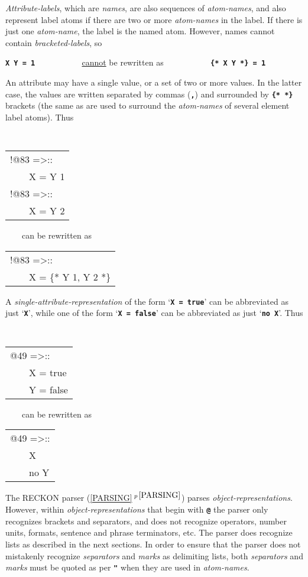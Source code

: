 \documentclass[12pt]{article}
\newcommand{\TT}[1]{{\tt \bfseries #1}}
\newcommand{\secref}[1]{\ref{#1}$\,^{p\,\pageref{#1}}$}
\begin{document}
{\em Attribute-labels}, which are {\em names}, are also sequences
of {\em atom-names}, and also represent label atoms if there are two
or more {\em atom-names} in the label.  If there is just one {\em atom-name},
the label is the named atom.  However, names
cannot contain {\em bracketed-labels},
so
\begin{center}
\TT{X Y = 1} ~~~~~~~~~~ \underline{cannot} be rewritten as ~~~~~~~~~~
         \TT{\{* X Y *\} = 1}
\end{center}

An attribute may have a single value, or a set of two or more
values.  In the latter case, the values are written separated by
commas (\TT{,}) and surrounded by \TT{\{*~*\}} brackets (the same
as are used to surround the {\em atom-names} of several element label atoms).
Thus
\begin{center}
\tt
\begin{tabular}{l}
!@83 =>:: \\
~~~~X = Y 1 \\
!@83 =>:: \\
~~~~X = Y 2 \\
\end{tabular}
~~~~{\rm can be rewritten as}~~~~
\begin{tabular}{l}
!@83 =>:: \\
~~~~X = \{* Y 1, Y 2 *\} \\
\end{tabular}
\end{center}

A {\em single-attribute-representation} of the form `\TT{X = true}'
can be abbreviated as just `\TT{X}', while one of the form
`\TT{X = false}' can be abbreviated as just `\TT{no X}'.  Thus
\begin{center}
\tt
\begin{tabular}{l}
@49 =>:: \\
~~~~X = true \\
~~~~Y = false \\
\end{tabular}
~~~~{\rm can be rewritten as}~~~~
\begin{tabular}{l}
@49 =>:: \\
~~~~X \\
~~~~no Y \\
\end{tabular}
\end{center}

The RECKON parser (\secref{PARSING}) parses {\em object-representations}.
However, within {\em object-representa\-tions} that begin with
\TT{@} the parser only recognizes brackets and separators, and does
not recognize operators, number units, formats, sentence and phrase
terminators, etc.\label{RAW-PARSING}  The parser does recognize
lists as described in the next sections.  In order to ensure that
the parser does not mistakenly recognize {\em separators} and {\em marks}
as delimiting lists,
both {\em separators} and {\em marks} must be quoted as per \TT{"} when
they are used in {\em atom-names}.
\end{document}
